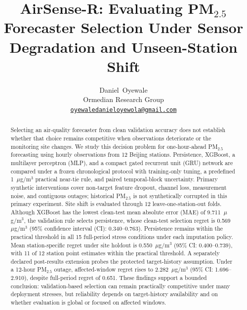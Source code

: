 \documentclass[journal]{IEEEtran}
\begin{document}
\title{AirSense-R: Evaluating PM$_{2.5}$ Forecaster Selection Under Sensor Degradation and Unseen-Station Shift}

\author{Daniel~Oyewale\\
{\normalsize Ormedian Research Group}\\
{\normalsize\href{mailto:oyewaledanieloyewola@gmail.com}{\texttt{oyewaledanieloyewola@gmail.com}}}}

\maketitle

\begin{abstract}
Selecting an air-quality forecaster from clean validation accuracy does not establish whether that choice remains competitive when observations deteriorate or the monitoring site changes. We study this decision problem for one-hour-ahead PM$_{2.5}$ forecasting using hourly observations from 12 Beijing stations. Persistence, XGBoost, a multilayer perceptron (MLP), and a compact gated recurrent unit (GRU) network are compared under a frozen chronological protocol with training-only tuning, a predefined 1~$\mu$g/m$^3$ practical near-tie rule, and paired temporal-block uncertainty. Primary synthetic interventions cover non-target feature dropout, channel loss, measurement noise, and contiguous outages; historical PM$_{2.5}$ is not synthetically corrupted in this primary experiment. Site shift is evaluated through 12 leave-one-station-out folds. Although XGBoost has the lowest clean-test mean absolute error (MAE) of 9.711~$\mu$g/m$^3$, the validation rule selects persistence, whose clean-test selection regret is 0.569~$\mu$g/m$^3$ (95\% confidence interval (CI): 0.340--0.763). Persistence remains within the practical threshold in all 15 full-period stress conditions under each imputation policy. Mean station-specific regret under site holdout is 0.550~$\mu$g/m$^3$ (95\% CI: 0.400--0.739), with 11 of 12 station point estimates within the practical threshold. A separately declared post-results extension probes the protected target-history assumption. Under a 12-hour PM$_{2.5}$ outage, affected-window regret rises to 2.282~$\mu$g/m$^3$ (95\% CI: 1.696--2.910), despite full-period regret of 0.651. These findings support a bounded conclusion: validation-based selection can remain practically competitive under many deployment stresses, but reliability depends on target-history availability and on whether evaluation is global or focused on affected windows.
\end{abstract}
\end{document}
